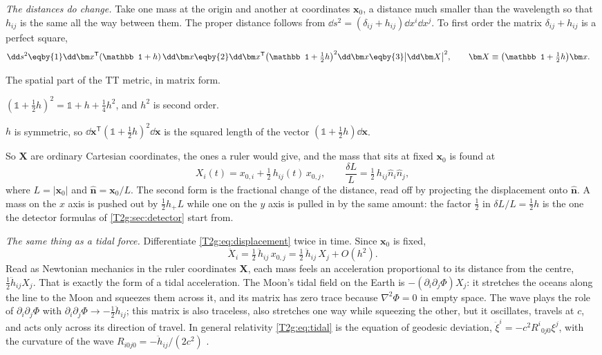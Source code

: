 \emph{The distances do change.} Take one mass at the origin and another at coordinates $\bm x_0$, a distance much smaller than the wavelength so that $h_{ij}$ is the same all the way between them. The proper distance follows from $\dd s^2=(\delta_{ij}+h_{ij})\dd x^i\dd x^j$. To first order the matrix $\delta_{ij}+h_{ij}$ is a perfect square,
\begin{align}
  \dd s^2
  &\eqby{1}\dd\bm x^{\mathsf T}(\mathbb 1+h)\,\dd\bm x
  \eqby{2}\dd\bm x^{\mathsf T}\big(\mathbb 1+\tfrac12h\big)^2\dd\bm x
  \eqby{3}\big\lvert\dd\bm X\big\rvert^2,
  \qquad \bm X\equiv\big(\mathbb 1+\tfrac12h\big)\bm x .
  \label{T2g:eq:proper}
\end{align}
\begin{explain}
  \item The spatial part of the TT metric, in matrix form.
  \item $(\mathbb 1+\tfrac12h)^2=\mathbb 1+h+\tfrac14h^2$, and $h^2$ is second order.
  \item $h$ is symmetric, so $\dd\bm x^{\mathsf T}(\mathbb 1+\tfrac12h)^2\dd\bm x$ is the squared length of the vector $(\mathbb 1+\tfrac12h)\dd\bm x$.
\end{explain}
So $\bm X$ are ordinary Cartesian coordinates, the ones a ruler would give, and the mass that sits at fixed $\bm x_0$ is found at
\begin{equation}
  X_i(t)=x_{0,i}+\tfrac12\,h_{ij}(t)\,x_{0,j},\qquad
  \frac{\delta L}{L}=\tfrac12\,h_{ij}\hat n_i\hat n_j ,
  \label{T2g:eq:displacement}
\end{equation}
where $L=\lvert\bm x_0\rvert$ and $\hat{\bm n}=\bm x_0/L$. The second form is the fractional change of the distance, read off by projecting the displacement onto $\hat{\bm n}$. A mass on the $x$ axis is pushed out by $\tfrac12h_+L$ while one on the $y$ axis is pulled in by the same amount: the factor $\tfrac12$ in $\delta L/L=\tfrac12h$ is the one the detector formulas of \cref{T2g:sec:detector} start from.

\emph{The same thing as a tidal force.} Differentiate \eqref{T2g:eq:displacement} twice in time. Since $\bm x_0$ is fixed,
\begin{equation}
  \ddot X_i=\tfrac12\,\ddot h_{ij}\,x_{0,j}=\tfrac12\,\ddot h_{ij}\,X_j+O(h^2).
  \label{T2g:eq:tidal}
\end{equation}
Read as Newtonian mechanics in the ruler coordinates $\bm X$, each mass feels an acceleration proportional to its distance from the centre, $\tfrac12\ddot h_{ij}X_j$. That is exactly the form of a tidal acceleration. The Moon's tidal field on the Earth is $-(\partial_i\partial_j\Phi)X_j$: it stretches the oceans along the line to the Moon and squeezes them across it, and its matrix has zero trace because $\nabla^2\Phi=0$ in empty space. The wave plays the role of $\partial_i\partial_j\Phi$ with $\partial_i\partial_j\Phi\to-\tfrac12\ddot h_{ij}$; this matrix is also traceless, also stretches one way while squeezing the other, but it oscillates, travels at $c$, and acts only across its direction of travel. In general relativity \eqref{T2g:eq:tidal} is the equation of geodesic deviation, $\ddot\xi^i=-c^2R^i{}_{0j0}\xi^j$, with the curvature of the wave $R_{i0j0}=-\ddot h_{ij}/(2c^2)$ \cite[Sec.~1.3]{Maggiore2007}.

